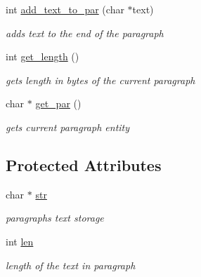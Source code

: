 \begin{DoxyCompactItemize}
int \hyperlink{classparagraph_a62943695dffea8c5bde766d1655306d9}{add\+\_\+text\+\_\+to\+\_\+par} (char $\ast$text)
\begin{DoxyCompactList}\small\item\em adds text to the end of the paragraph \end{DoxyCompactList}\item 
\mbox{\label{classparagraph_a22fa601dfb378d04790ad286745022b1}} 
int \hyperlink{classparagraph_a22fa601dfb378d04790ad286745022b1}{get\+\_\+length} ()
\begin{DoxyCompactList}\small\item\em gets length in bytes of the current paragraph \end{DoxyCompactList}\item 
\mbox{\label{classparagraph_ab32f99c4e1c5dbb87072d1eafa83ca0a}} 
char $\ast$ \hyperlink{classparagraph_ab32f99c4e1c5dbb87072d1eafa83ca0a}{get\+\_\+par} ()
\begin{DoxyCompactList}\small\item\em gets current paragraph entity \end{DoxyCompactList}\end{DoxyCompactItemize}
\subsection*{Protected Attributes}
\begin{DoxyCompactItemize}
\item 
\mbox{\label{classparagraph_a5fdae75d172b31c2f97061201bac07b4}} 
char $\ast$ \hyperlink{classparagraph_a5fdae75d172b31c2f97061201bac07b4}{str}
\begin{DoxyCompactList}\small\item\em paragraph\textquotesingle{}s text storage \end{DoxyCompactList}\item 
\mbox{\label{classparagraph_a5c12aedc1d491624627e24cd13a48b5f}} 
int \hyperlink{classparagraph_a5c12aedc1d491624627e24cd13a48b5f}{len}
\begin{DoxyCompactList}\small\item\em length of the text in paragraph \end{DoxyCompactList}\end{DoxyCompactItemize}


